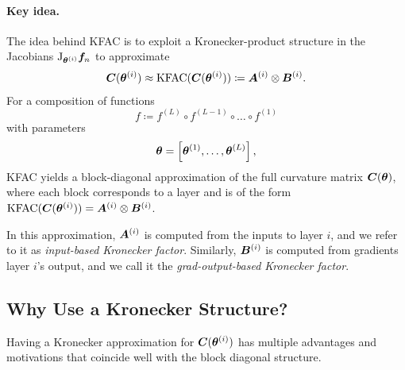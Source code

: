 \paragraph{Key idea.} The idea behind KFAC is to exploit a Kronecker-product structure in the Jacobians $\mathrm{J}_{{\bm{\theta}}^{(i)}}{\bm{f}}_n$ to approximate
\begin{align*}
  {\bm{C}}({\bm{\theta}}^{(i)})
  \approx
  \mathrm{KFAC}({\bm{C}}({\bm{\theta}}^{(i)}))
  \coloneqq {\bm{A}}^{(i)} \otimes {\bm{B}}^{(i)}.
\end{align*}
For a composition of functions $$f \coloneqq f^{(L)} \circ f^{(L-1)} \circ \dots \circ f^{(1)}$$ with parameters $${\bm{\theta}} = \left[ {\bm{\theta}}^{(1)}, \dots, {\bm{\theta}}^{(L)} \right],$$ KFAC yields a block-diagonal approximation of the full curvature matrix ${\bm{C}}({\bm{\theta}})$, where each block corresponds to a layer and is of the form $\mathrm{KFAC}({\bm{C}}({\bm{\theta}}^{(i)})) = {\bm{A}}^{{(i)}} \otimes {\bm{B}}^{(i)}$.

In this approximation, ${\bm{A}}^{(i)}$ is computed from the inputs to layer $i$, and we refer to it as \emph{input-based Kronecker factor}.
Similarly, ${\bm{B}}^{(i)}$ is computed from gradients \wrt layer $i$'s output, and we call it the \emph{grad-output-based Kronecker factor}.

\subsection{Why Use a Kronecker Structure?}
Having a Kronecker approximation for ${\bm{C}}({\bm{\theta}}^{(i)})$ has multiple advantages and motivations that coincide well with the block diagonal structure.

